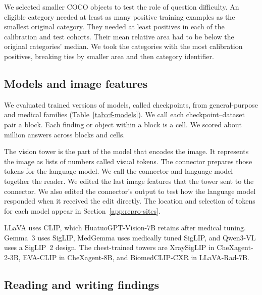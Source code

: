 We selected smaller COCO objects to test the role of question difficulty. An eligible category needed at least as many positive training examples as the smallest original category. They needed at least \jnMinClassSupport{} positives in each of the calibration and test cohorts. Their mean relative area had to be below the original categories' median. We took the \jnCoreConceptCount{} categories with the most calibration positives, breaking ties by smaller area and then category identifier.

\subsection{Models and image features}
\label{app:cf-grid}

We evaluated \cfCheckpoints{} trained versions of models, called checkpoints, from \cfFamiliesWord{} general-purpose and medical families (Table~\ref{tab:cf-models}). We call each checkpoint--dataset pair a block. Each finding or object within a block is a cell. We scored about \jnScoredAnswersMillions{} million answers across \cfBlocks{} blocks and \cfCells{} cells.

The vision tower is the part of the model that encodes the image. It represents the image as lists of numbers called visual tokens. The connector prepares those tokens for the language model. We call the connector and language model together the reader. We edited the last image features that the tower sent to the connector. We also edited the connector's output to test how the language model responded when it received the edit directly. The location and selection of tokens for each model appear in Section~\ref{app:repro-sites}.

LLaVA uses CLIP,\cite{radford2021clip} which HuatuoGPT-Vision-7B retains after medical tuning. Gemma~3 uses SigLIP,\cite{zhai2023siglip} MedGemma uses medically tuned SigLIP,\cite{sellergren2025medgemma} and Qwen3-VL uses a SigLIP~2 design.\cite{tschannen2025siglip2} The chest-trained towers are XraySigLIP in CheXagent-2-3B, EVA-CLIP in CheXagent-8B, and BiomedCLIP-CXR in LLaVA-Rad-7B.\cite{chen2024chexagent,sun2023evaclip,zhang2025biomedclip,zambranochaves2025llavarad}



\subsection{Reading and writing findings}
\label{sec:site}

